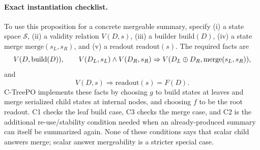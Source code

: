 \paragraph{Exact instantiation checklist.}
To use this proposition for a concrete mergeable summary, specify
(i) a state space $\mathcal{S}$, (ii) a validity relation $V(D,s)$,
(iii) a builder $\mathrm{build}(D)$, (iv) a state merge
$\mathrm{merge}(s_L,s_R)$, and (v) a readout
$\mathrm{readout}(s)$.  The required facts are
\[
V(D,\mathrm{build}(D)),\qquad
V(D_L,s_L)\wedge V(D_R,s_R)
\Rightarrow
V(D_L\oplus D_R,\mathrm{merge}(s_L,s_R)),
\]
and
\[
V(D,s)\Rightarrow \mathrm{readout}(s)=F(D).
\]
C-TreePO implements these facts by choosing $g$ to build states at leaves and
merge serialized child states at internal nodes, and choosing $f$ to be the
root readout. C1 checks the leaf build case, C3 checks the merge case, and C2
is the additional re-use/stability condition needed when an already-produced
summary can itself be summarized again. None of these conditions says that
scalar child answers merge; scalar answer mergeability is a stricter special
case.

